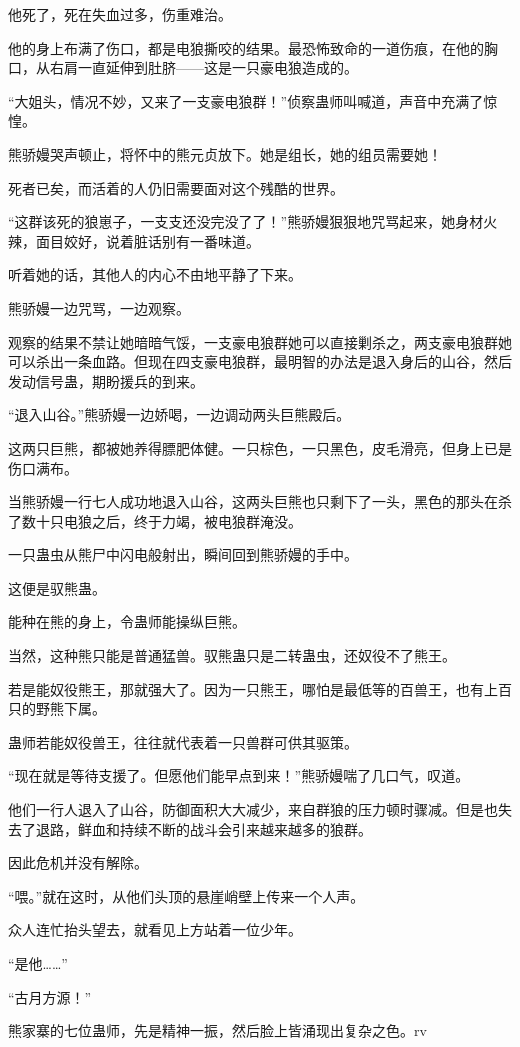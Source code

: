 \begin{this_body}
他死了，死在失血过多，伤重难治。

他的身上布满了伤口，都是电狼撕咬的结果。最恐怖致命的一道伤痕，在他的胸口，从右肩一直延伸到肚脐——这是一只豪电狼造成的。

“大姐头，情况不妙，又来了一支豪电狼群！”侦察蛊师叫喊道，声音中充满了惊惶。

熊骄嫚哭声顿止，将怀中的熊元贞放下。她是组长，她的组员需要她！

死者已矣，而活着的人仍旧需要面对这个残酷的世界。

“这群该死的狼崽子，一支支还没完没了了！”熊骄嫚狠狠地咒骂起来，她身材火辣，面目姣好，说着脏话别有一番味道。

听着她的话，其他人的内心不由地平静了下来。

熊骄嫚一边咒骂，一边观察。

观察的结果不禁让她暗暗气馁，一支豪电狼群她可以直接剿杀之，两支豪电狼群她可以杀出一条血路。但现在四支豪电狼群，最明智的办法是退入身后的山谷，然后发动信号蛊，期盼援兵的到来。

“退入山谷。”熊骄嫚一边娇喝，一边调动两头巨熊殿后。

这两只巨熊，都被她养得膘肥体健。一只棕色，一只黑色，皮毛滑亮，但身上已是伤口满布。

当熊骄嫚一行七人成功地退入山谷，这两头巨熊也只剩下了一头，黑色的那头在杀了数十只电狼之后，终于力竭，被电狼群淹没。

一只蛊虫从熊尸中闪电般射出，瞬间回到熊骄嫚的手中。

这便是驭熊蛊。

能种在熊的身上，令蛊师能操纵巨熊。

当然，这种熊只能是普通猛兽。驭熊蛊只是二转蛊虫，还奴役不了熊王。

若是能奴役熊王，那就强大了。因为一只熊王，哪怕是最低等的百兽王，也有上百只的野熊下属。

蛊师若能奴役兽王，往往就代表着一只兽群可供其驱策。

“现在就是等待支援了。但愿他们能早点到来！”熊骄嫚喘了几口气，叹道。

他们一行人退入了山谷，防御面积大大减少，来自群狼的压力顿时骤减。但是也失去了退路，鲜血和持续不断的战斗会引来越来越多的狼群。

因此危机并没有解除。

“喂。”就在这时，从他们头顶的悬崖峭壁上传来一个人声。

众人连忙抬头望去，就看见上方站着一位少年。

“是他……”

“古月方源！”

熊家寨的七位蛊师，先是精神一振，然后脸上皆涌现出复杂之色。rv

\end{this_body}

